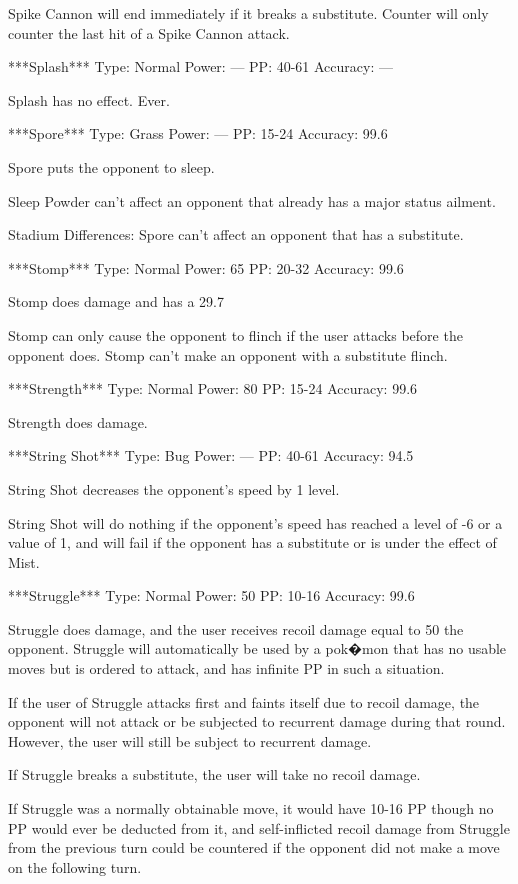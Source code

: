 \documentclass[reprint, aps, prl, paper=A4]{revtex4-1}
\begin{document}
Spike Cannon will end immediately if it breaks a substitute. Counter will only counter the last
hit of a Spike Cannon attack.


***Splash***
Type: Normal
Power: ---
PP: 40-61
Accuracy: ---

Splash has no effect. Ever.


***Spore***
Type: Grass
Power: ---
PP: 15-24
Accuracy: 99.6%

Spore puts the opponent to sleep.

Sleep Powder can't affect an opponent that already has a major status ailment.

Stadium Differences:
Spore can't affect an opponent that has a substitute.


***Stomp***
Type: Normal
Power: 65
PP: 20-32
Accuracy: 99.6%

Stomp does damage and has a 29.7%

Stomp can only cause the opponent to flinch if the user attacks before the opponent does. Stomp
can't make an opponent with a substitute flinch.


***Strength***
Type: Normal
Power: 80
PP: 15-24
Accuracy: 99.6%

Strength does damage.


***String Shot***
Type: Bug
Power: ---
PP: 40-61
Accuracy: 94.5%

String Shot decreases the opponent's speed by 1 level.

String Shot will do nothing if the opponent's speed has reached a level of -6 or a value of 1,
and will fail if the opponent has a substitute or is under the effect of Mist.


***Struggle***
Type: Normal
Power: 50
PP: 10-16
Accuracy: 99.6%

Struggle does damage, and the user receives recoil damage equal to 50%
the opponent. Struggle will automatically be used by a pok�mon that has no usable moves but
is ordered to attack, and has infinite PP in such a situation.

If the user of Struggle attacks first and faints itself due to recoil damage, the opponent will
not attack or be subjected to recurrent damage during that round. However, the user will still
be subject to recurrent damage.

If Struggle breaks a substitute, the user will take no recoil damage.

If Struggle was a normally obtainable move, it would have 10-16 PP though no PP would ever be
deducted from it, and self-inflicted recoil damage from Struggle from the previous turn could
be countered if the opponent did not make a move on the following turn.
\end{document}
